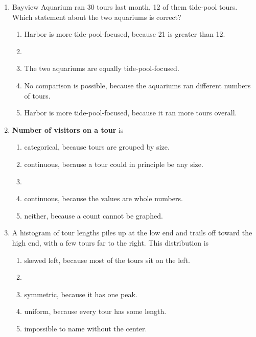 \documentclass[12pt]{article}
\newcommand{\letterroom}{\rule[-15pt]{0pt}{36pt}}
\begin{document}
\begin{enumerate}[leftmargin=1.9em, itemsep=0.13in]
  \boxguard[9]
  \item Bayview Aquarium ran 30 tours last month, 12 of them tide-pool tours. Which statement
        about the two aquariums is correct?
        \begin{enumerate}[label=\textbf{(\Alph*)}, leftmargin=2.2em, itemsep=2pt]
          \item Harbor is more tide-pool-focused, because 21 is greater than 12.
          \item {}
          \item The two aquariums are equally tide-pool-focused.
          \item No comparison is possible, because the aquariums ran different numbers of tours.
          \item Harbor is more tide-pool-focused, because it ran more tours overall.
                \hfill{}\letterroom
        \end{enumerate}

  \boxguard[9]
  \item \textbf{Number of visitors on a tour} is
        \begin{enumerate}[label=\textbf{(\Alph*)}, leftmargin=2.2em, itemsep=2pt]
          \item categorical, because tours are grouped by size.
          \item continuous, because a tour could in principle be any size.
          \item {}
          \item continuous, because the values are whole numbers.
          \item neither, because a count cannot be graphed.
                \hfill{}\letterroom
        \end{enumerate}

  \boxguard[9]
  \item A histogram of tour lengths piles up at the low end and trails off toward the high end,
        with a few tours far to the right. This distribution is
        \begin{enumerate}[label=\textbf{(\Alph*)}, leftmargin=2.2em, itemsep=2pt]
          \item skewed left, because most of the tours sit on the left.
          \item {}
          \item symmetric, because it has one peak.
          \item uniform, because every tour has some length.
          \item impossible to name without the center.
                \hfill{}\letterroom
        \end{enumerate}


\end{enumerate}
\end{document}
